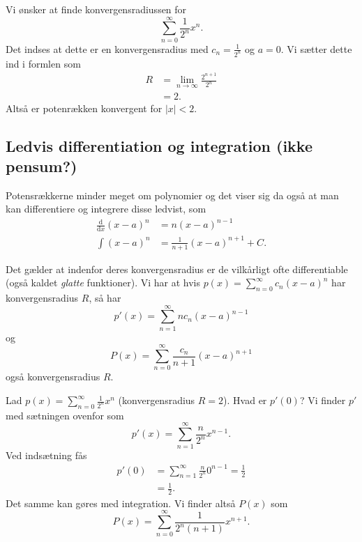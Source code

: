 \begin{eks} 
  Vi ønsker at finde konvergensradiussen for
  \[ 
  \sum_{n = 0}^{\infty} \frac{1}{2^{n}} x^{n}
  .\]
  \bigbreak
  Det indses at dette er en konvergensradius med $c_n = \frac{1}{2^{n}}$ og $a = 0$. Vi sætter dette ind i formlen som
  \begin{align*}
  R &= \lim_{n \to \infty} \frac{2^{n+1}}{2^{n}} \\
    &= 2
  .\end{align*}
  Altså er potenrækken konvergent for $|x| < 2$.
\end{eks}

\subsection{Ledvis differentiation og integration (ikke pensum?)}
Potensrækkerne minder meget om polynomier og det viser sig da også at man kan differentiere og integrere disse ledvist, som
\begin{align*}
  \frac{\mathrm{d}}{\mathrm{d}x} (x-a)^{n} &= n(x-a)^{n-1} \\
  \int (x-a)^{n} &= \frac{1}{n+1} (x-a)^{n+1} + C
.\end{align*}

\begin{sæt} 
  Det gælder at indenfor deres konvergensradius er de vilkårligt ofte differentiable (også kaldet \textit{glatte} funktioner). Vi har at hvis $p(x) = \sum_{n = 0}^{\infty} c_n(x-a)^{n}$ har konvergensradius $R$, så har
  \[ 
  p'(x) = \sum_{n = 1}^{\infty} nc_n(x-a)^{n-1}
  \]
  og
  \[ 
  P(x) = \sum_{n = 0}^{\infty} \frac{c_n}{n+1}(x-a)^{n+1}
  \]
  også konvergensradius $R$.
\end{sæt}

\begin{eks} 
  Lad $p(x) = \sum_{n = 0}^{\infty} \frac{1}{2^n}x^n$ (konvergensradius $R = 2$). Hvad er $p'(0)$?
  \bigbreak
  Vi finder $p'$ med sætningen ovenfor som
  \[ 
  p'(x) = \sum_{n = 1}^{\infty} \frac{n}{2^{n}} x^{n-1}
  .\]
  Ved indsætning fås
  \begin{align*}
    p'(0) &= \sum_{n = 1}^{\infty} \frac{n}{2^{n}} 0^{n-1} = \frac{1}{2} \\
    &= \frac{1}{2}
  .\end{align*}
  \bigbreak
  Det samme kan gøres med integration. Vi finder altså $P(x)$ som
  \[ 
  P(x) = \sum_{n = 0}^{\infty} \frac{1}{2^{n}(n+1)} x^{n+1}
  .\]
\end{eks}

